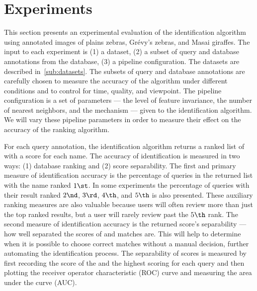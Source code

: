 
\section{Experiments}\label{sec:experiments}

    This section presents an experimental evaluation of the identification algorithm using annotated images of
      plains zebras, Grévy's zebras, and Masai giraffes.
    The input to each experiment is
    (1) a dataset,
    (2) a subset of query and database annotations from the database,
    (3) a pipeline configuration.
    The datasets are described in~\cref{sub:datasets}.
    The subsets of query and database annotations are carefully chosen to measure the accuracy of the algorithm
      under different conditions and to control for time, quality, and viewpoint.
    The pipeline configuration is a set of parameters --- \eg{} the level of feature invariance, the number of
      nearest neighbors, and the \namescoring{} mechanism --- given to the identification algorithm.
    We will vary these pipeline parameters in order to measure their effect on the accuracy of the ranking
      algorithm.

    For each query annotation, the identification algorithm returns a ranked list of \names{} with a score for
      each name.
    The accuracy of identification is measured in two ways:
    (1) database ranking and
    (2) score separability.
    The first and primary measure of identification accuracy is the percentage of queries in the returned list
      with the \groundtrue{} name ranked $1\st$.
    In some experiments the percentage of queries with their \groundtrue{} result ranked $2\nd$, $3\rd$, $4\th$,
      and $5\th$ is also presented.
    These auxiliary ranking measures are also valuable because users will often review more than just the top
      ranked results, but a user will rarely review past the $5\th$ rank.
    The second measure of identification accuracy is the returned score's separability --- \ie{} how well
      separated the scores of \groundtrue{} and \groundfalse{} matches are.
    This will help to determine when it is possible to choose correct matches without a manual decision, further
      automating the identification process.
    The separability of scores is measured by first recording the score of the \groundtrue{} \name{} and the
      highest scoring \groundfalse{} \name{} for each query and then plotting the receiver operator characteristic
      (ROC) curve and measuring the area under the curve (AUC).

